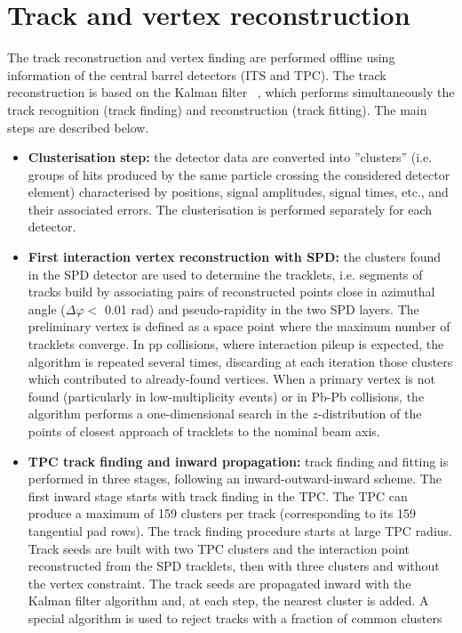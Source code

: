 \section{Track and vertex reconstruction}
\label{sec:tracking}
The track reconstruction and vertex finding are performed offline using information of the central
barrel detectors (ITS and TPC). The track reconstruction is based on the Kalman filter~\cite{} , which performs
simultaneously the track recognition (track finding) and reconstruction (track fitting). The main steps are described below.
\begin{itemize}
\item {\bf Clusterisation step:} the detector data are converted into ''clusters'' (i.e. groups of hits produced by the 
same particle crossing the considered detector element) characterised 
by positions, signal amplitudes, signal times, etc., and their associated errors. The clusterisation 
is performed separately for each detector. 
\item {\bf First interaction vertex reconstruction with SPD:} the clusters found in the SPD detector are used to determine the tracklets,
i.e. segments of tracks build by associating pairs of reconstructed points close in azimuthal angle ($\Delta \varphi <$ 0.01 rad) and 
pseudo-rapidity in the two SPD layers.
The preliminary vertex is defined as a space point where the maximum number of tracklets converge.
In pp collisions, where interaction pileup is expected, the algorithm is repeated several times, discarding at 
each iteration those clusters which contributed to already-found vertices. When a primary vertex is not found 
(particularly in low-multiplicity events) or in Pb-Pb collisions, the algorithm performs a one-dimensional 
search in the $z$-distribution of the points of closest approach of tracklets to the nominal beam axis.
\item {\bf TPC track finding and inward propagation:} track finding and fitting is performed in three stages, following an inward-outward-inward scheme.
The first inward stage starts with track finding in the TPC. The TPC can produce a maximum of 159 clusters per track
(corresponding to its 159 tangential pad rows). The track finding procedure starts at large TPC radius.
Track seeds are built with two TPC clusters and the interaction point reconstructed from the SPD tracklets, then with three clusters 
and without the vertex constraint. The track seeds are propagated inward with the Kalman filter algorithm and, at each step, 
the nearest cluster is added. A special algorithm is used to reject tracks with a fraction of common clusters

\end{itemize}
